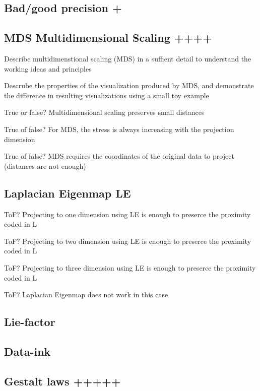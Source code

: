 \documentclass[a4paper]{article}
\begin{document}
\subsection{Bad/good precision +}

\subsection{MDS Multidimensional Scaling ++++}

Describe multidimenstional scaling (MDS) in a suffient detail to understand the working ideas and principles

Descrube the properties of the visualization produced by MDS, and demonstrate the difference in resulting visualizations using a small toy example

True or false? Multidimensional scaling preserves small distances

True of false? For MDS, the stress is always increasing with the projection dimension

True of false? MDS requires the coordinates of the original data to project (distances are not enough)

\subsection{Laplacian Eigenmap LE}

ToF? Projecting to one dimension using LE is enough to preserce the proximity coded in L

ToF? Projecting to two dimension using LE is enough to preserce the proximity coded in L

ToF? Projecting to three dimension using LE is enough to preserce the proximity coded in L

ToF? Laplacian Eigenmap does not work in this case

\subsection{Lie-factor}

\subsection{Data-ink}

\subsection{Gestalt laws +++++}
\end{document}

